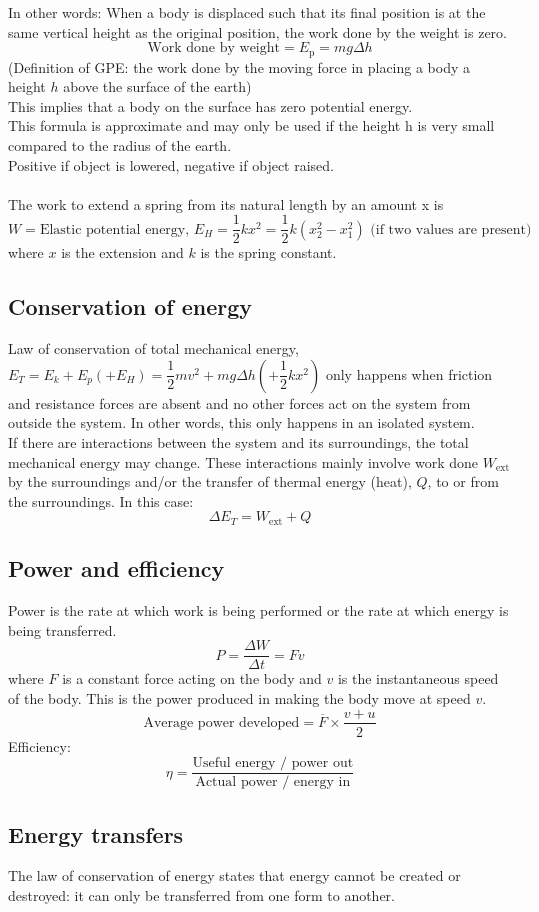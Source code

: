 \documentclass[a4paper,12pt]{article}
\begin{document}
In other words: When a body is displaced such that its final position is at the same vertical height as the original position, the work done by the weight is zero.
\[\text{Work done by weight}=E_\text{p}=mg\Delta h\]
(Definition of GPE: the work done by the moving force in placing a body a height $h$ above the surface of the earth)\\
This implies that a body on the surface has zero potential energy.\\
This formula is approximate and may only be used if the height h is very small compared to the radius of the earth.\\
Positive if object is lowered, negative if object raised.\\\\
The work to extend a spring from its natural length by an amount x is
\[W=\text{Elastic potential energy, } E_H=\dfrac{1}{2}kx^2=\dfrac{1}{2}k(x_2^2-x_1^2) \text{ (if two values are present)}\]
where $x$ is the extension and $k$ is the spring constant.
\subsection{Conservation of energy}
Law of conservation of total mechanical energy, $E_T=E_k+E_p(+E_H)=\dfrac{1}{2}mv^2+mg\Delta h\left(+\dfrac{1}{2}kx^2\right)$ only happens when friction and resistance forces are absent and no other forces act on the system from outside the system. In other words, this only happens in an isolated system.\\
If there are interactions between the system and its surroundings, the total mechanical energy may change. These interactions mainly involve work done $W_\text{ext}$ by the surroundings and/or the transfer of thermal energy (heat), $Q$, to or from the surroundings. In this case:
\[\Delta E_T=W_\text{ext} + Q\]
\subsection{Power and efficiency}
Power is the rate at which work is being performed or the rate at which energy is being transferred.
\[P=\dfrac{\Delta W}{\Delta t}=Fv\]
where $F$ is a constant force acting on the body and $v$ is the instantaneous speed of the body. This is the power produced in making the body move at speed $v$.
\[\text{Average power developed}=\overline{F}\times\dfrac{v+u}{2}\]
Efficiency:
\[\eta=\dfrac{\text{Useful energy / power out}}{\text{Actual power / energy in}}\]
\subsection{Energy transfers}
The law of conservation of energy states that energy cannot be created or destroyed: it can only be transferred from one form to another.
\end{document}
